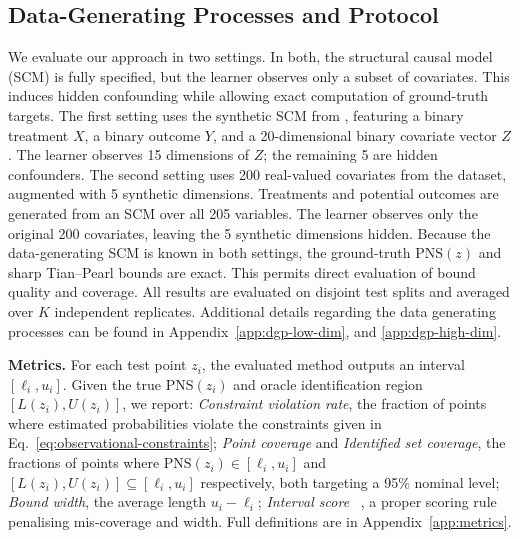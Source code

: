 \documentclass[accepted]{uai2026} %
\theoremstyle{plain}
\theoremstyle{definition}
\theoremstyle{remark}
\begin{document}
\subsection{Data-Generating Processes and Protocol}
 We evaluate our approach in two settings. In both, the structural causal model (SCM) is fully specified, 
 but the learner observes only a subset of covariates. This induces hidden confounding while allowing 
 exact computation of ground-truth targets.
The first setting uses the synthetic SCM from \citep{li2022probabilities}, featuring a binary treatment $X$, 
a binary outcome $Y$, and a 20-dimensional binary covariate vector $Z$. The learner observes 15 
dimensions of $Z$; the remaining 5 are hidden confounders.
The second setting uses 200 real-valued covariates from the \citet{ACIC2019} dataset, 
augmented with 5 synthetic dimensions. Treatments and potential outcomes are 
generated from an SCM over all 205 variables. The learner observes only the 
original 200 covariates, leaving the 5 synthetic dimensions hidden.
Because the data-generating SCM is known in both settings, the ground-truth $\text{PNS}(z)$ 
and sharp Tian–Pearl bounds are exact. This permits direct evaluation of bound quality and 
coverage. All results are evaluated on disjoint test splits and averaged over $K$ 
independent replicates. Additional details regarding the data generating processes 
can be found in Appendix~\ref{app:dgp-low-dim}, and \ref{app:dgp-high-dim}.






\textbf{Metrics.} For each test point $z_i$, the evaluated method outputs an interval $[\ell_i, u_i]$. 
Given the true $\mathrm{PNS}(z_i)$ and oracle identification region $[L(z_i), U(z_i)]$, 
we report: \textit{Constraint violation rate}, the fraction of points where estimated probabilities 
violate the constraints given in Eq.~\ref{eq:observational-constraints}; \textit{Point coverage} 
and \textit{Identified set coverage}, the fractions of points where 
$\mathrm{PNS}(z_i) \in [\ell_i, u_i]$ and $[L(z_i), U(z_i)] \subseteq [\ell_i, u_i]$ respectively, 
both targeting a 95\% nominal level; \textit{Bound width}, the average length $u_i - \ell_i$; 
\textit{Interval score} ~\cite{winkler1972decision}, a proper scoring rule penalising mis-coverage and width. Full definitions are in Appendix~\ref{app:metrics}.
\vspace{-1em} %
\end{document}
